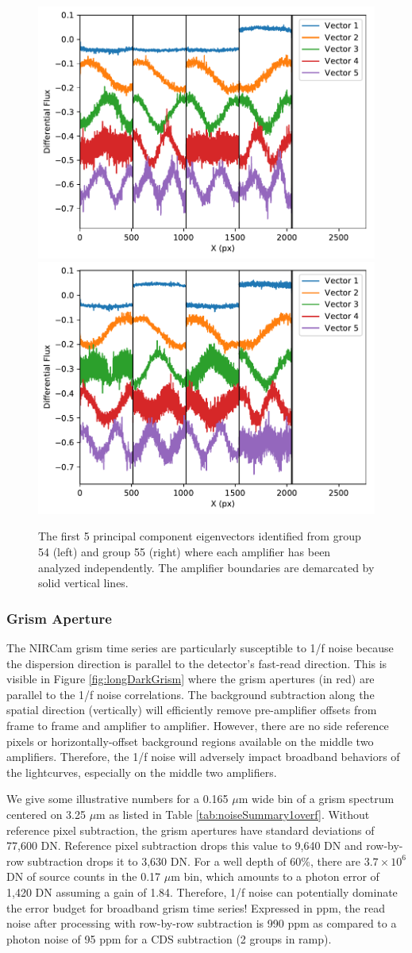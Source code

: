 \documentclass{aastex62}
\begin{document}
\begin{figure}[!hbtp]
\centering
\includegraphics[width=.4\columnwidth]{pca_dark_ind_amp_grp_54_extra_bias_sub.pdf}
\includegraphics[width=.4\columnwidth]{pca_dark_ind_amp_grp_55_extra_bias_sub.pdf}
\caption{The first 5 principal component eigenvectors identified from group 54 (left) and group 55 (right) where each amplifier has been analyzed independently.
The amplifier boundaries are demarcated by solid vertical lines.
}\label{fig:pcaEigenvectorsIndAmp}
\end{figure}

\clearpage

\subsubsection{Grism Aperture}
The NIRCam grism time series are particularly susceptible to 1/f noise because the dispersion direction is parallel to the detector's fast-read direction.
This is visible in Figure \ref{fig:longDarkGrism} where the grism apertures (in red) are parallel to the 1/f noise correlations.
The background subtraction along the spatial direction (vertically) will efficiently remove pre-amplifier offsets from frame to frame and amplifier to amplifier.
However, there are no side reference pixels or horizontally-offset background regions available on the middle two amplifiers.
Therefore, the 1/f noise will adversely impact broadband behaviors of the lightcurves, especially on the middle two amplifiers.

We give some illustrative numbers for a 0.165 $\mu$m wide bin of a grism spectrum centered on 3.25 $\mu$m as listed in Table \ref{tab:noiseSummary1overf}.
Without reference pixel subtraction, the grism apertures have standard deviations of 77,600 DN.
Reference pixel subtraction drops this value to 9,640 DN and row-by-row subtraction drops it to 3,630 DN.
For a well depth of 60\%, there are $3.7 \times 10^6$ DN of source counts in the 0.17 $\mu$m bin, which amounts to a photon error of 1,420 DN assuming a gain of 1.84.
Therefore, 1/f noise can potentially dominate the error budget for broadband grism time series!
Expressed in ppm, the read noise after processing with row-by-row subtraction is 990 ppm as compared to a photon noise of 95 ppm for a CDS subtraction (2 groups in ramp).
\end{document}
